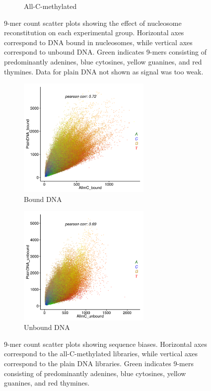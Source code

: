 \documentclass[parskip=full, numbers=noenddot]{scrreprt}
\begin{document}
\begin{figure}[htpb]
\begin{subfigure}[htpb]{0.7\textwidth}
    \caption{All-C-methylated}
    \label{fig:kmer_bound_all}
  \end{subfigure}
  \caption{9-mer count scatter plots showing the effect of nucleosome reconstitution on each experimental group.  Horizontal axes correspond to DNA bound in nucleosomes, while vertical axes correspond to unbound DNA.  Green indicates 9-mers consisting of predominantly adenines, blue cytosines, yellow guanines, and red thymines.  Data for plain DNA not shown as signal was too weak.}
  \label{fig:kmer_bound}
\end{figure}

\begin{figure}[htpb]
  \centering
  \begin{subfigure}[htpb]{0.7\textwidth}
    \centering
    \includegraphics[width=0.7\textwidth]{kmer_plainbXallb}
    \caption{Bound DNA}
    \label{fig:kmer_bias_bound}
  \end{subfigure}
  \begin{subfigure}[htpb]{0.7\textwidth}
    \centering
    \includegraphics[width=0.7\textwidth]{kmer_plainubXallub}
    \caption{Unbound DNA}
    \label{fig:kmer_bias_unbound}
  \end{subfigure}
  \caption{9-mer count scatter plots showing sequence biases.  Horizontal axes correspond to the all-C-methylated libraries, while vertical axes correspond to the plain DNA libraries.  Green indicates 9-mers consisting of predominantly adenines, blue cytosines, yellow guanines, and red thymines.}
  \label{fig:kmer_bias}
\end{figure}
\end{document}
